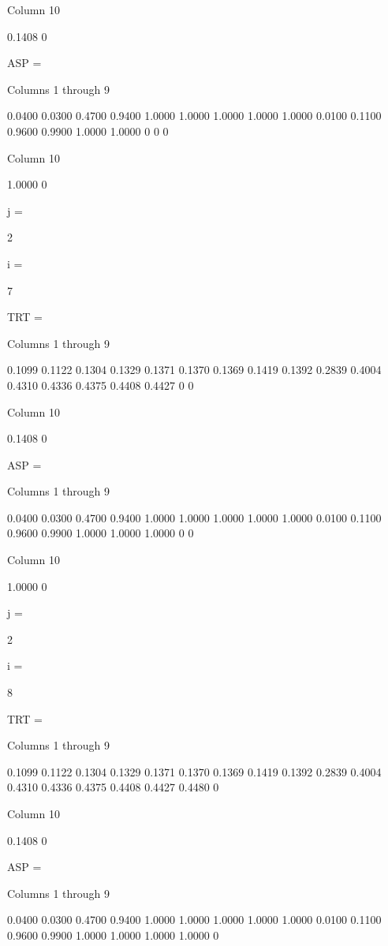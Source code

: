   Column 10

    0.1408
         0


ASP =

  Columns 1 through 9

    0.0400    0.0300    0.4700    0.9400    1.0000    1.0000    1.0000    1.0000    1.0000
    0.0100    0.1100    0.9600    0.9900    1.0000    1.0000         0         0         0

  Column 10

    1.0000
         0


j =

     2


i =

     7


TRT =

  Columns 1 through 9

    0.1099    0.1122    0.1304    0.1329    0.1371    0.1370    0.1369    0.1419    0.1392
    0.2839    0.4004    0.4310    0.4336    0.4375    0.4408    0.4427         0         0

  Column 10

    0.1408
         0


ASP =

  Columns 1 through 9

    0.0400    0.0300    0.4700    0.9400    1.0000    1.0000    1.0000    1.0000    1.0000
    0.0100    0.1100    0.9600    0.9900    1.0000    1.0000    1.0000         0         0

  Column 10

    1.0000
         0


j =

     2


i =

     8


TRT =

  Columns 1 through 9

    0.1099    0.1122    0.1304    0.1329    0.1371    0.1370    0.1369    0.1419    0.1392
    0.2839    0.4004    0.4310    0.4336    0.4375    0.4408    0.4427    0.4480         0

  Column 10

    0.1408
         0


ASP =

  Columns 1 through 9

    0.0400    0.0300    0.4700    0.9400    1.0000    1.0000    1.0000    1.0000    1.0000
    0.0100    0.1100    0.9600    0.9900    1.0000    1.0000    1.0000    1.0000         0


